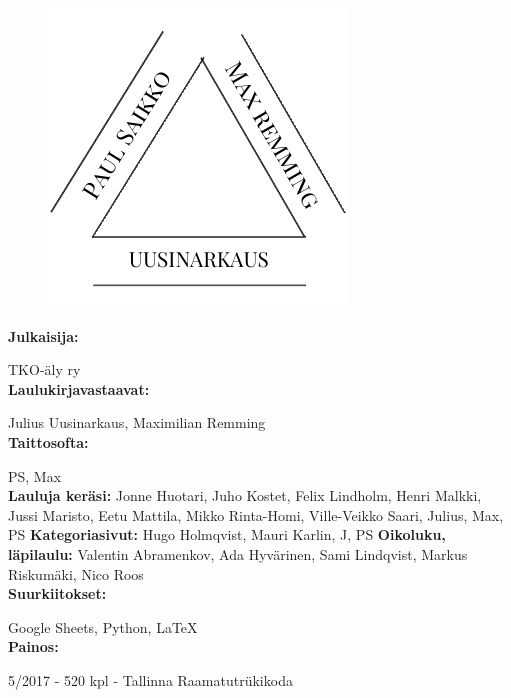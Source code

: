 


\newpage
\begin{figure}[t]
\includegraphics[scale=0.82]{graphics/tekijat.pdf}
\centering
\end{figure}

\textbf{Julkaisija:}

TKO-äly ry
\\


\textbf{Laulukirjavastaavat:}

Julius Uusinarkaus, Maximilian Remming
\\

\textbf{Taittosofta:}

PS, Max
\\

\textbf{Lauluja keräsi:} Jonne Huotari, Juho Kostet, Felix Lindholm, Henri Malkki, Jussi Maristo, Eetu Mattila, Mikko Rinta-Homi, Ville-Veikko Saari, Julius, Max, PS
\textbf{Kategoriasivut:} Hugo Holmqvist, Mauri Karlin, J, PS
\textbf{Oikoluku, läpilaulu:} Valentin Abramenkov, Ada Hyvärinen, Sami Lindqvist, Markus Riskumäki, Nico Roos
\\

\textbf{Suurkiitokset:}

Google Sheets, Python, \LaTeX
\\

\textbf{Painos:}

5/2017 - 520 kpl - Tallinna Raamatutrükikoda

\newpage

